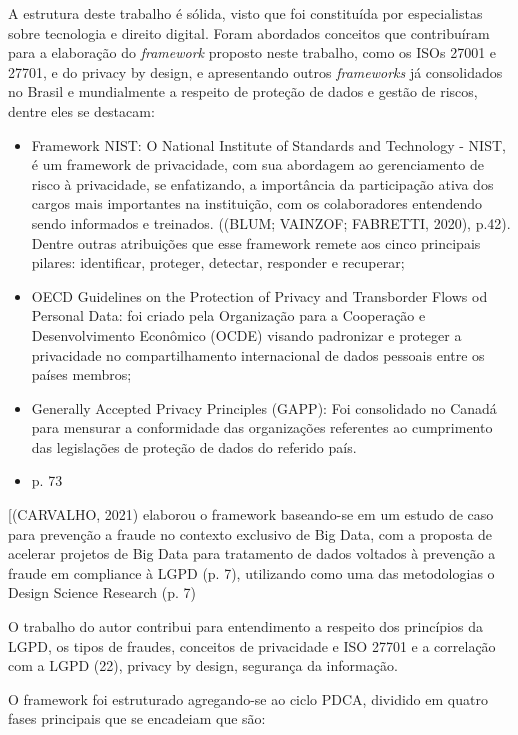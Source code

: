 \documentclass[
	12pt,				%
	openright,			%
	oneside,			%
	a4paper,			%
	english,			%
	french,				%
	spanish,			%
	brazil,				%
	]{abntex2}
\begin{document}
A estrutura deste trabalho é sólida, visto que foi constituída por especialistas sobre tecnologia e direito digital. Foram abordados conceitos que contribuíram para a elaboração do \textit{framework} proposto neste trabalho, como os ISOs 27001 e 27701, e do privacy by design, e apresentando outros \textit{frameworks} já consolidados no Brasil e mundialmente a respeito de proteção de dados e gestão de riscos, dentre eles se destacam:

\begin{itemize}
\item Framework NIST: O National Institute of Standards and Technology - NIST, é um framework de privacidade, com sua abordagem ao gerenciamento de risco à privacidade, se enfatizando, a importância da participação ativa dos cargos mais importantes na instituição, com os colaboradores entendendo sendo informados e treinados. ((BLUM; VAINZOF; FABRETTI, 2020), p.42). Dentre outras atribuições que esse framework remete aos cinco principais pilares: identificar, proteger, detectar, responder e recuperar; 
\item OECD Guidelines on the Protection of Privacy and Transborder Flows od Personal Data: foi criado pela Organização para a Cooperação e Desenvolvimento Econômico (OCDE) visando padronizar e proteger a privacidade no compartilhamento internacional de dados pessoais entre os países membros;
\item Generally Accepted Privacy Principles (GAPP): Foi consolidado no Canadá para mensurar a conformidade das organizações referentes ao cumprimento das legislações de proteção de dados do referido país. 
\item p. 73
\end{itemize}

[(CARVALHO, 2021) elaborou o framework baseando-se em um estudo de caso para prevenção a fraude no contexto exclusivo de Big Data, com a proposta de acelerar projetos de Big Data para tratamento de dados voltados à prevenção a fraude em compliance à LGPD (p. 7), utilizando como uma das metodologias o Design Science Research (p. 7) 


O trabalho do autor contribui para entendimento a respeito dos princípios da LGPD, os tipos de fraudes, conceitos de privacidade e ISO 27701 e a correlação com a LGPD (22), privacy by design, segurança da informação.

O framework foi estruturado agregando-se ao ciclo PDCA, dividido em quatro fases principais que se encadeiam que são:
\end{document}
